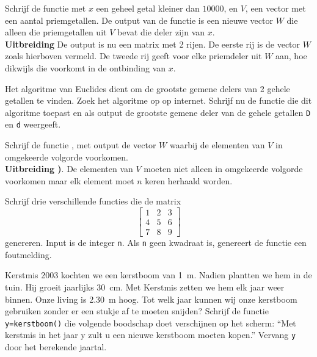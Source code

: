 \begin{oef}
    Schrijf de functie  met $x$ een 
    geheel getal kleiner dan  $10000$, en $V$, een vector met een 
    aantal priemgetallen. De output van de functie is een nieuwe 
    vector $W$ die alleen die priemgetallen uit $V$ bevat die deler 
    zijn van $x$.\\
    \textbf{Uitbreiding} De output is nu een matrix met 2 rijen. De 
    eerste rij is de vector $W$ zoals hierboven vermeld. De tweede 
    rij geeft voor elke priemdeler uit $W$ aan, hoe dikwijls die voorkomt in 
    de ontbinding van $x$.
    \end{oef}
\begin{oef}
Het algoritme van Euclides dient  om de grootste gemene delers van 2 gehele getallen
te vinden. Zoek het algoritme op op internet. Schrijf nu de functie 
 die dit algoritme toepast en als output de grootste gemene deler van de gehele getallen \verb+D+ en \verb+d+ weergeeft.
\end{oef}

\begin{oef}
Schrijf de functie , met output de vector $W$ 
waarbij de elementen van $V$ in omgekeerde volgorde voorkomen.\\
\textbf{Uitbreiding  )}. De elementen van $V$ 
moeten niet alleen in omgekeerde volgorde voorkomen maar elk element 
moet $n$ keren herhaald worden.
\end{oef}

\begin{oef}
Schrijf drie verschillende functies die de matrix 
\begin{equation*}
\begin{bmatrix}
 1&2  &3  \\
 4& 5 &6 \\
 7& 8 &9
\end{bmatrix}
\end{equation*}
genereren. Input is de integer \verb+n+. Als \verb+n+ geen kwadraat is, genereert de functie een foutmelding.
\end{oef}

\begin{oef}
Kerstmis 2003 kochten we een kerstboom van \SI{1}{\meter}. Nadien plantten we hem in de tuin. Hij groeit jaarlijks \SI{30}{\centi\meter}. Met Kerstmis zetten we hem elk jaar weer binnen. Onze living is \SI{2,30}{\meter} hoog. Tot welk jaar kunnen wij onze kerstboom gebruiken zonder er een stukje af te moeten snijden? Schrijf de functie \verb/y=kerstboom()/ die volgende boodschap doet verschijnen op het scherm: ``Met kerstmis in het jaar y zult u een nieuwe kerstboom moeten kopen.'' Vervang \verb/y/ door het berekende jaartal.
\end{oef}



